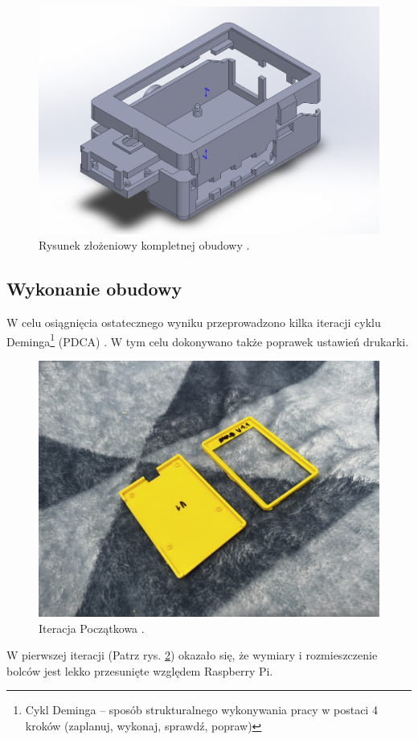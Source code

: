 \documentclass[a4paper,12pt,reqno]{article}
\begin{document}
\begin{figure}[H]%
\centering
\includegraphics[width=0.8\columnwidth]{imgs/zlozenie.jpg}
\caption{Rysunek złożeniowy kompletnej obudowy \cite{img_me}. \label{etui_zlozenie}}
\quad
\end{figure}

\newpage
\subsection{Wykonanie obudowy}
W celu osiągnięcia ostatecznego wyniku przeprowadzono kilka iteracji cyklu Deminga\footnote{Cykl Deminga – sposób strukturalnego wykonywania pracy w postaci 4 kroków (zaplanuj, wykonaj, sprawdź, popraw)} (PDCA) \cite{leanByJK}. W tym celu dokonywano także poprawek ustawień drukarki.

\begin{figure}[H]%
\centering
\includegraphics[width=0.8\columnwidth]{imgs/print_0.jpg}
\caption{Iteracja Początkowa \cite{img_me}. \label{PDCA_00}}
\quad
\end{figure}

W pierwszej iteracji (Patrz rys. \ref{PDCA_00}) okazało się, że wymiary i rozmieszczenie bolców jest lekko przesunięte względem Raspberry Pi.
\end{document}
